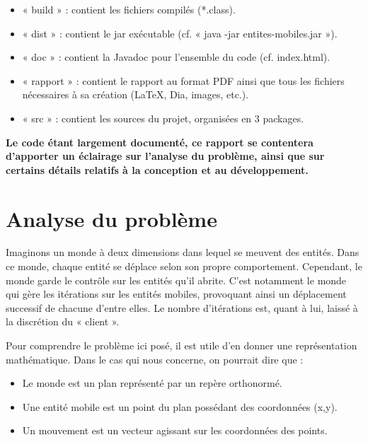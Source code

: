 \documentclass[a4paper,10pt]{report}
\begin{document}
\begin{itemize}
 \item{« build » : contient les fichiers compilés (*.class).}
 \item{« dist » : contient le jar exécutable (cf. « java -jar entites-mobiles.jar »).}
 \item{« doc » : contient la Javadoc pour l'ensemble du code (cf. index.html).}
 \item{« rapport » : contient le rapport au format PDF ainsi que tous les fichiers nécessaires à sa création (\LaTeX, Dia, images, etc.).}
 \item{« src » : contient les sources du projet, organisées en 3 packages.}
\end{itemize}

\textbf{Le code étant largement documenté, ce rapport se contentera d'apporter un éclairage sur l'analyse du problème, ainsi que sur certains détails relatifs à la conception et au développement.}


\section*{Analyse du problème}

Imaginons un monde à deux dimensions dans lequel se meuvent des entités. Dans ce monde, chaque entité se déplace selon son propre comportement. Cependant, le monde garde le contrôle sur les entités qu'il abrite. C'est notamment le monde qui gère les itérations sur les entités mobiles, provoquant ainsi un déplacement successif de chacune d'entre elles. Le nombre d'itérations est, quant à lui, laissé à la discrétion du « client ».

Pour comprendre le problème ici posé, il est utile d'en donner une représentation mathématique. Dans le cas qui nous concerne, on pourrait dire que :

\vspace{1pt}

\begin{itemize}
 \item{Le monde est un plan représenté par un repère orthonormé.}
 \item{Une entité mobile est un point du plan possédant des coordonnées (x,y).}
 \item{Un mouvement est un vecteur agissant sur les coordonnées des points.}
\end{itemize}

\vspace{1pt}
\end{document}
